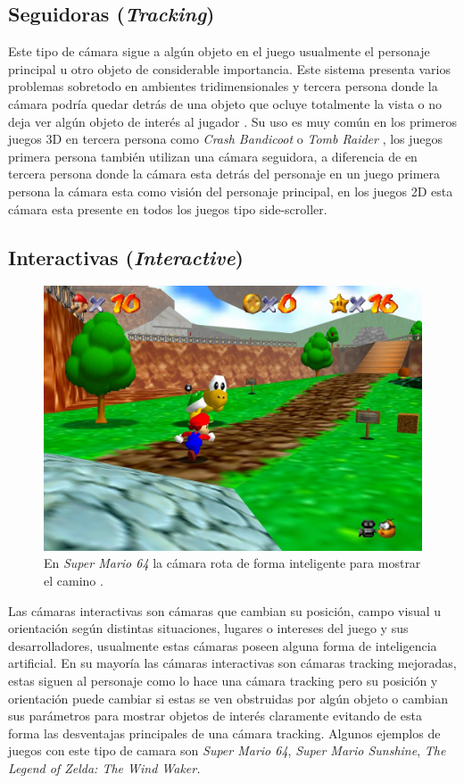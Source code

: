 \subsection{Seguidoras (\emph{Tracking})}
Este tipo de cámara sigue a algún objeto en el juego usualmente el personaje principal u otro objeto de considerable importancia. Este sistema presenta varios problemas sobretodo en ambientes tridimensionales y tercera persona donde la cámara podría quedar detrás de una objeto que ocluye totalmente la vista o no deja ver algún objeto de interés al jugador \cite{fund_gamedesign}. Su uso es muy común en los primeros juegos 3D en tercera persona como \emph{Crash Bandicoot} \cite{crashbandicoot} o \emph{Tomb Raider} \cite[p.~39]{bobbatesgamedesign}, los juegos primera persona también utilizan una cámara seguidora, a diferencia de en tercera persona donde la cámara esta detrás del personaje en un juego primera persona la cámara esta como visión del personaje principal, en los juegos 2D esta cámara esta presente en todos los juegos tipo side-scroller.
\newpage
\subsection{Interactivas (\emph{Interactive})}
\begin{figure}
\includegraphics[width=\linewidth]{media/supermario64.jpg} 
\caption{En \emph{Super Mario 64} la cámara rota de forma inteligente para mostrar el camino \cite{supermario64}.}
\end{figure}
Las cámaras interactivas son cámaras que cambian su posición, campo visual u orientación según distintas situaciones, lugares o intereses del juego y sus desarrolladores, usualmente estas cámaras poseen alguna forma de inteligencia artificial. En su mayoría las cámaras interactivas son cámaras tracking mejoradas, estas siguen al personaje como lo hace una cámara tracking pero su posición y orientación puede cambiar si estas se ven obstruidas por algún objeto o cambian sus parámetros para mostrar objetos de interés claramente evitando de esta forma las desventajas principales de una cámara tracking. Algunos ejemplos de juegos con este tipo de camara son \emph{Super Mario 64}, \emph{Super Mario Sunshine}, \emph{The Legend of Zelda: The Wind Waker.}
